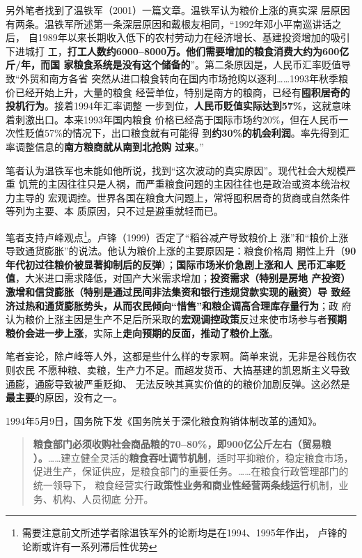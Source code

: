 另外笔者找到了温铁军（2001）一篇文章\cite{6cibodong}。温铁军认为粮价上涨的真实深
层原因有两条。温铁军所述第一条深层原因和戴根友相同，“1992年邓小平南巡讲话之后，
自1989年以来长期收入低下的农村劳动力在经济增长、基建投资增加的吸引下进城打
工，\textbf{打工人数约6000--8000万。他们需要增加的粮食消费大约为600亿斤/年，而国
  家粮食系统是没有这个储备的}”。第二条原因是，人民币汇率贬值导致“外贸和南方各省
突然从进口粮食转向在国内市场抢购以逐利……1993年秋季粮价已经开始上升，大量的粮食
经营单位，特别是南方的粮商，已经有\textbf{囤积居奇的投机行为}。接着1994年汇率调整
一步到位，\textbf{人民币贬值实际达到57\%}，这就意味着刺激出口。本来1993年国内粮食
价格已经高于国际市场约20\%，但在人民币一次性贬值57\%的情况下，出口粮食就有可能得
到\textbf{约30\%的机会利润}。率先得到汇率调整信息的\textbf{南方粮商就从南到北抢购
  过来}。”

笔者认为温铁军也未能如他所说，找到“这次波动的真实原因”。现代社会大规模严重
饥荒的主因往往只是人祸，而严重粮食问题的主因往往也是政治或资本统治权力主导的
宏观调控。世界各国在粮食大问题上，常将囤积居奇的货商或自然条件等列为主要、本
质原因，只不过是避重就轻而已。

笔者支持卢峰观点\footnote{需要注意前文所述学者除温铁军外的论断均是在1994、1995年作出，
  卢锋的论断或许有一系列滞后性优势}。卢锋（1999）否定了“稻谷减产导致粮价上
涨”和“粮价上涨导致通货膨胀”的说法。他认为粮价上涨的主要原因是：粮食价格周
期性上升（\textbf{90年代初过往粮价被显著抑制后的反弹}）；\textbf{国际市场米价急剧上涨和人
  民币汇率贬值}，大米进口需求降低，对国产大米需求增加；\textbf{投资需求（特别是房地
  产投资）激增和信贷膨胀（特别是通过民间非法集资和银行违规贷款实现的融资）导
  致经济过热和通货膨胀势头，从而农民倾向“惜售”和粮企调高合理库存量行为}；政
府认为粮价上涨主因是生产不足后所采取的\textbf{宏观调控政策}反过来使市场参与者\textbf{预期
  粮价会进一步上涨}，实际上\textbf{走向预期的反面，推动了粮价上涨}。

笔者妄论，除卢峰等人外，这都是些什么样的专家啊。简单来说，无非是谷贱伤农则农民
不愿种粮、卖粮，生产力不足。而超发货币、大搞基建的凯恩斯主义导致通膨，通膨导致被严重贬抑、
无法反映其真实价值的的粮价加剧反弹。这必然是\textbf{最主要}的原因，没有之一。

1994年5月9日，国务院下发《国务院关于深化粮食购销体制改革的通知》。
\begin{quotation}
  \textbf{粮食部门必须收购社会商品粮的70--80\%，即900亿公斤左右（贸易粮
    ）。}……建立健全灵活的\textbf{粮食吞吐调节机制}，适时平抑粮价，稳定粮食市场，
  促进生产，保证供应，是粮食部门的重要任务。……在粮食行政管理部门的统一领导下，
  粮食经营实行\textbf{政策性业务和商业性经营两条线运行}机制，业务、机构、人员彻底
  分开。
\end{quotation}

